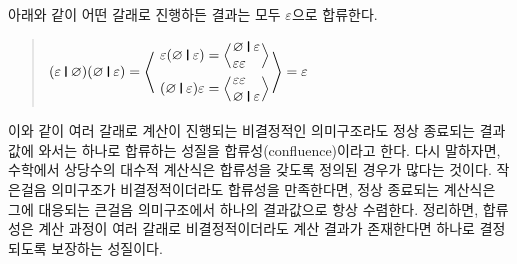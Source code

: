 아래와 같이 어떤 갈래로 진행하든 결과는 모두 $\varepsilon$으로
합류한다.
\begin{quote}
\(
(\varepsilon\VERT \varnothing)(\varnothing\VERT \varepsilon) =
\left<\phantom{\begin{array}{l}.\\[4ex].\end{array}}\hspace*{-4ex}\right.
\begin{array}{l}
  \varepsilon(\varnothing\VERT \varepsilon) =
     \Big<\hspace*{-1ex}
     \begin{array}{l}
       \varnothing\VERT \varepsilon \\
       \varepsilon\varepsilon
     \end{array}\hspace*{-1ex}
     \Big>
  \\[1ex]
  (\varnothing\VERT \varepsilon)\varepsilon =
     \Big\langle\hspace*{-1ex}
     \begin{array}{l}
      \varepsilon\varepsilon  \\
      \varnothing\VERT \varepsilon
     \end{array}\hspace*{-1ex}
     \Big>
\end{array}
\left.\phantom{\begin{array}{l}.\\[4ex].\end{array}}\hspace*{-4.5ex}\right>
= \varepsilon
\)
\end{quote}
이와 같이 여러 갈래로 계산이 진행되는 비결정적인 의미구조라도
정상 종료되는 결과값에 와서는 하나로 합류하는 성질을
%
%
합류성(confluence)이라고 한다. 다시 말하자면, 수학에서 상당수의
대수적 계산식은 합류성을 갖도록 정의된 경우가 많다는 것이다.
작은걸음 의미구조가 비결정적이더라도 합류성을 만족한다면,
정상 종료되는 계산식은 그에 대응되는 큰걸음 의미구조에서
하나의 결과값으로 항상 수렴한다. 정리하면, 합류성은 계산 과정이
여러 갈래로 비결정적이더라도 계산 결과가 존재한다면 하나로
결정되도록 보장하는 성질이다.


